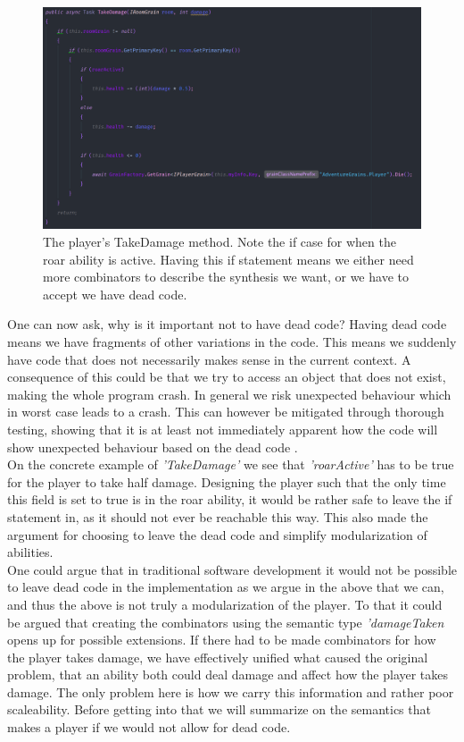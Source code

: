 \begin{figure}[H]
	\centering
	\includegraphics[width=0.9\linewidth]{Materials/Decomposition/TakeDamage}
	\caption{The player's TakeDamage method. Note the if case for when the roar ability is active. Having this if statement means we either need more combinators to describe the synthesis we want, or we have to accept we have dead code. }
	\label{PlayerTakeDamage}
\end{figure}
One can now ask, why is it important not to have dead code? Having dead code means we have fragments of other variations in the code. This means we suddenly have code that does not necessarily makes sense in the current context. A consequence of this could be that we try to access an object that does not exist, making the whole program crash. In general we risk unexpected behaviour which in worst case leads to a crash. This can however be mitigated through thorough testing, showing that it is at least not immediately apparent how the code will show unexpected behaviour based on the dead code .\\
On the concrete example of \textit{'TakeDamage'} we see that \textit{'roarActive'} has to be true for the player to take half damage. Designing the player such that the only time this field is set to true is in the roar ability, it would be rather safe to leave the if statement in, as it should not ever be reachable this way. This also made the argument for choosing to leave the dead code and simplify modularization of abilities.\\
One could argue that in traditional software development it would not be possible to leave dead code in the implementation as we argue in the above that we can, and thus the above is not truly a modularization of the player. To that it could be argued that creating the combinators using the semantic type \textit{'damageTaken} opens up for possible extensions. If there had to be made combinators for how the player takes damage, we have effectively unified what caused the original problem, that an ability both could deal damage and affect how the player takes damage. The only problem here is how we carry this information and rather poor scaleability. Before getting into that we will summarize on the semantics that makes a player if we would not allow for dead code.\\
